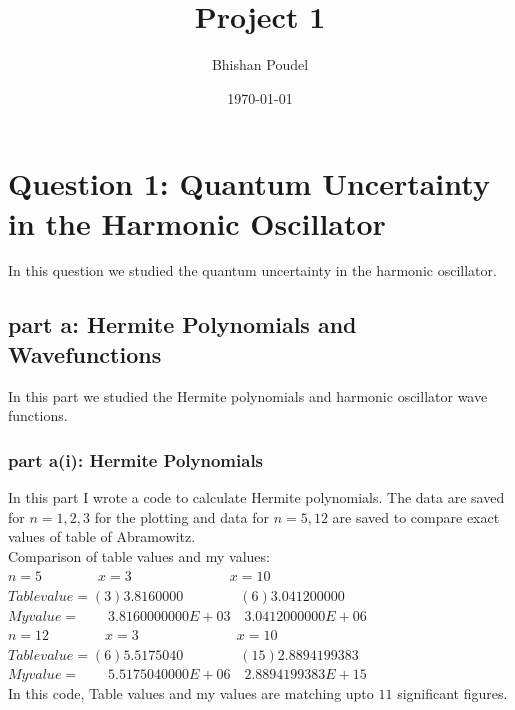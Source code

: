 \documentclass[11pt,a4paper,english]{article}
\title{Project 1}
\author{Bhishan Poudel}
\date{\today}
\begin{document}
\maketitle
\tableofcontents
\listoffigures
\clearpage


\section{Question 1: Quantum Uncertainty in the Harmonic Oscillator}
In this question we studied the quantum uncertainty in the harmonic oscillator.\\

	
	\subsection{part a: Hermite Polynomials and Wavefunctions}
	
	In this part we studied the Hermite polynomials and harmonic oscillator wave functions.
	
	\subsubsection{part a(i): Hermite Polynomials}
	
In this part I wrote a code to calculate Hermite polynomials. The data are saved for $n=1,2,3 $ for the plotting and data for $n=5,12$ are saved to compare exact values of table of Abramowitz.\\
Comparison of table values and my values:\\
$n=5  \quad\quad\quad\quad x=3  \quad\quad\quad\quad\quad\quad\quad x=10$\\
$Table value = (3) 3.81600 00 \quad\quad\quad\quad (6) 3.04120 0000 $\\
$My value    = \quad\quad3.8160000000E+03 \quad 3.0412000000E+06$\\

$n=12  \quad\quad\quad\quad x=3  \quad\quad\quad\quad\quad\quad\quad x=10$\\
$Table value = (6) 5.51750 40 \quad\quad\quad\quad (15) 2.88941 99383 $\\
$My value    = \quad\quad5.5175040000E+06 \quad 2.8894199383E+15$\\
In this code, Table values and my values are matching upto $11$ significant figures.\\
\end{document}
